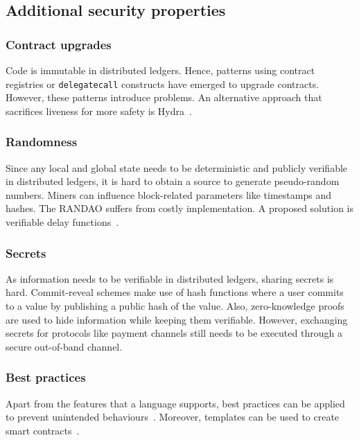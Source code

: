 \subsection{Additional security properties} 
\subsubsection{Contract upgrades}
Code is immutable in distributed ledgers. Hence, patterns using contract registries or \texttt{delegatecall} constructs have emerged to upgrade contracts. However, these patterns introduce problems. An alternative approach that sacrifices liveness for more safety is Hydra~\cite{Breidenbach2018}.

\subsubsection{Randomness}
Since any local and global state needs to be deterministic and publicly verifiable in distributed ledgers, it is hard to obtain a source to generate pseudo-random numbers.
Miners can influence block-related parameters like timestamps and hashes. The RANDAO suffers from costly implementation. A proposed solution is verifiable delay functions~\cite{Boneh2018}.

\subsubsection{Secrets}
As information needs to be verifiable in distributed ledgers, sharing secrets is hard. 
Commit-reveal schemes make use of hash functions where a user commits to a value by publishing a public hash of the value. 
Also, zero-knowledge proofs are used to hide information while keeping them verifiable.
However, exchanging secrets for protocols like payment channels still needs to be executed through a secure out-of-band channel.

\subsubsection{Best practices}
Apart from the features that a language supports, best practices can be applied to prevent unintended behaviours~\cite{Wohrer2018,ConsenSys2018Security}.
Moreover, templates can be used to create smart contracts~\cite{Clack2016}.
